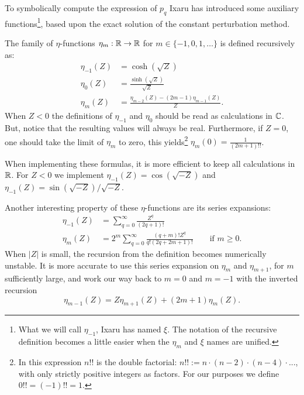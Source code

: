 To symbolically compute the expression of $p_q$ Ixaru has introduced some auxiliary functions\footnote{What we will call $\eta_{-1}$, Ixaru has named $\xi$. The notation of the recursive definition becomes a little easier when the $\eta_m$ and $\xi$ names are unified.}, based upon the exact solution of the constant perturbation method.

\begin{definition}[Ixaru 1984]\label{def:c2_eta_functions}
    The family of $\eta$-functions $\eta_m : \mathbb{R} \to \mathbb{R}$ for $m \in \{-1, 0, 1, \dots\}$ is defined recursively as:
    \begin{align*}
        \eta_{-1}(Z) & = \cosh(\sqrt{Z})                                        \\
        \eta_{0}(Z)  & = \frac{\sinh(\sqrt{Z})}{\sqrt{Z}}                       \\
        \eta_{m}(Z)  & = \frac{\eta_{m-2}(Z) - (2m-1) \eta_{m-1}(Z)}{Z}\text{.}
    \end{align*}
    When $Z < 0$ the definitions of $\eta_{-1}$ and $\eta_{0}$ should be read as calculations in $\mathbb{C}$. But, notice that the resulting values will always be real. Furthermore, if $Z = 0$, one should take the limit of $\eta_m$ to zero, this yields\footnote{In this expression $n!!$ is the double factorial: $n!! := n\cdot (n-2) \cdot (n - 4) \cdot ...$, with only strictly positive integers as factors. For our purposes we define $0!! = (-1)!! = 1$.} $\eta_m(0) = \frac{1}{(2m+1)!!}$.
\end{definition}

When implementing these formulas, it is more efficient to keep all calculations in $\mathbb{R}$. For $Z < 0$ we implement $\eta_{-1}(Z) = \cos(\sqrt{-Z})$ and $\eta_{-1}(Z) = \sin(\sqrt{-Z})/\sqrt{-Z}$.

Another interesting property of these $\eta$-functions are its series expansions:\begin{align*}
    \eta_{-1}(Z) & = \sum_{q=0}^{\infty} \frac{Z^q}{(2q + 1)!}                                                      \\
    \eta_{m}(Z)  & = 2^m \sum_{q=0}^{\infty} \frac{(q+m)! Z^q}{q!(2q + 2m + 1)!} \qquad \text{if } m \geq 0\text{.}
\end{align*}
When $|Z|$ is small, the recursion from the definition becomes numerically unstable. It is more accurate to use this series expansion on $\eta_m$ and $\eta_{m+1}$, for $m$ sufficiently large, and work our way back to $m=0$ and $m=-1$ with the inverted recursion
$$
    \eta_{m-1}(Z) = Z \eta_{m+1}(Z) + (2 m + 1) \eta_{m}(Z)
    \text{.}
$$

